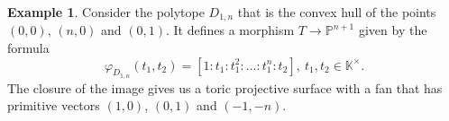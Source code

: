 \documentclass[a4paper,draft,reqno,12pt]{amsart}
\theoremstyle{definition}
\theoremstyle{definition}
\newtheorem{example}{Example}
\theoremstyle{remark}
\def\BK{{\mathbb K}}
\def\BK{{\mathbb K}}
\def\BP{{\mathbb P}}
\begin{document}
\begin{example}
    Consider the polytope $D_{1,n}$ that is the convex hull of the points $(0,0)$, $(n, 0)$ and $(0, 1)$. It defines a morphism $T\to\BP^{n+1}$ given by the formula\begin{equation}\label{wppmapping}
        \varphi_{D_{1,n}}(t_1,t_2)=[1:t_1:t_1^2:\dotsc:t_1^n:t_2], \ t_1, t_2 \in \BK^\times.
    \end{equation} The closure of the image gives us a toric projective surface with a fan that has primitive vectors $(1, 0)$, $(0, 1)$ and $(-1,-n)$.

    \begin{figure}[h]
    \begin{minipage}{0.495\textwidth}
     \centering 
     \begin{tikzpicture}[x=0.75pt,y=0.75pt,yscale=-1,xscale=1]


\end{tikzpicture}
\end{minipage}
\end{figure}
\end{example}
\end{document}
